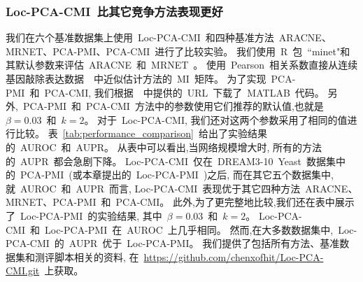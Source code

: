 \subsubsection{Loc-PCA-CMI~比其它竞争方法表现更好}

我们在六个基准数据集上使用~Loc-PCA-CMI~和四种基准方法~ARACNE、MRNET、PCA-PMI、PCA-CMI~进行了比较实验。
我们使用~R~包~``minet"和其默认参数来评估~ARACNE~和~MRNET~\cite{meyer2008minet}。
使用~Pearson~相关系数直接从连续基因敲除表达数据~\cite{olsen2008impact,meyer2010information}~中近似估计方法的~MI~矩阵。
为了实现~PCA-PMI~和~PCA-CMI, 我们根据~\cite{zhang2011inferring,zhao2016part}~中提供的~URL~下载了~MATLAB~代码。
另外,~PCA-PMI~和~PCA-CMI~方法中的参数使用它们推荐的默认值,也就是~$\beta = 0.03$~和~$k = 2$。
对于~Loc-PCA-CMI, 我们还对这两个参数采用了相同的值进行比较。
表~\ref{tab:performance_comparison}~给出了实验结果的~AUROC~和~AUPR。
从表中可以看出,当网络规模增大时, 所有的方法的~AUPR~都会急剧下降。
Loc-PCA-CMI~仅在~DREAM3-10~Yeast~数据集中的~PCA-PMI~(或本章提出的~Loc-PCA-PMI~)之后,
而在其它五个数据集中,就~AUROC~和~AUPR~而言,
Loc-PCA-CMI~表现优于其它四种方法~ARACNE、MRNET、PCA-PMI~和~PCA-CMI。
此外,为了更完整地比较,我们还在表中展示了~Loc-PCA-PMI~的实验结果,
其中~$\beta = 0.03$~和~$k = 2$。
Loc-PCA-CMI~和~Loc-PCA-PMI~在~AUROC~上几乎相同。
然而,在大多数数据集中,~Loc-PCA-CMI~的~AUPR~优于~Loc-PCA-PMI。
我们提供了包括所有方法、基准数据集和测评脚本相关的资料, 
在~\url{https://github.com/chenxofhit/Loc-PCA-CMI.git}~上获取。


